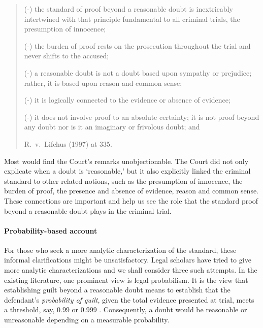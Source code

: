 \documentclass[10pt]{article}
\begin{document}
\begin{quote}
(-) the standard of proof beyond a reasonable 
doubt is inextricably intertwined with that  
principle fundamental to all criminal trials, 
the presumption of innocence;

(-) the burden of proof rests on the prosecution 
throughout the trial and never shifts to the
accused; 

(-) a reasonable doubt is not a doubt based upon 
sympathy or prejudice; 
rather, it is based upon reason and common sense;

(-) it is logically connected to the evidence or  
absence of evidence; 
 
(-) it does not involve proof to an absolute certainty; it is not proof beyond any doubt nor is 
it an imaginary or frivolous doubt;  and

R.\ v.\ Lifchus (1997) at 335.
\end{quote}

\noindent
Most would find the Court's remarks unobjectionable. The  Court did not only explicate when a doubt is `reasonable,' 
but it also explicitly linked the criminal standard to other related notions, such as the presumption of innocence, the burden of proof, the presence and absence of evidence, 
reason and common sense. These connections are important and help us see the role that the standard proof beyond a reasonable doubt plays in the criminal trial. 


\paragraph{Probability-based account}

For those who seek a more analytic characterization of the standard, 
these informal clarifications might be unsatisfactory. Legal scholars have tried to give more analytic characterizations 
and we shall consider three such attempts.  In the existing literature, one prominent view is legal probabilism. It is the view that establishing guilt beyond a reasonable doubt means to establish that the defendant's \textit{probability of guilt}, given the total evidence presented at trial, meets a threshold, say, 0.99 or 0.999  \citep{Kaplan1968Decision, Kaye1999Clarifying-the-, Tillers2007}. Consequently, a doubt would be reasonable or unreasonable depending on a measurable probability.  
\end{document}
